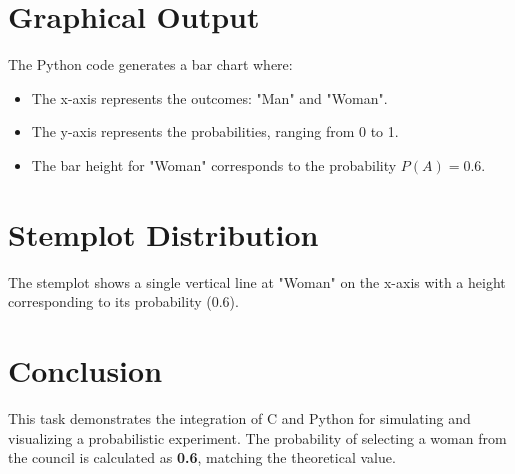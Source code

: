 \documentclass[journal]{IEEEtran}
\begin{document}
\section*{Graphical Output}
The Python code generates a bar chart where:
\begin{itemize}
    \item The x-axis represents the outcomes: "Man" and "Woman".
    \item The y-axis represents the probabilities, ranging from 0 to 1.
    \item The bar height for "Woman" corresponds to the probability $P(A) = 0.6$.
\end{itemize}

\section*{Stemplot Distribution}
The stemplot shows a single vertical line at "Woman" on the x-axis with a height corresponding to its probability (0.6).

\section*{Conclusion}
This task demonstrates the integration of C and Python for simulating and visualizing a probabilistic experiment. The probability of selecting a woman from the council is calculated as \textbf{0.6}, matching the theoretical value.
\end{document}
